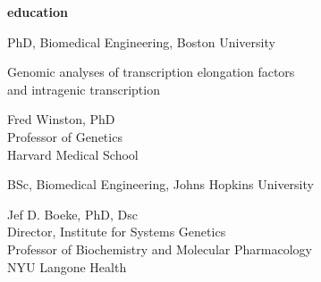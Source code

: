 \documentclass[11pt, a4paper]{article}
\begin{document}
\vspace{2em}
\textbf{\Large education}
\begin{description}[topsep=2pt, align=right, leftmargin=!, labelwidth=\widthof{\textbf{2019}}]
    \item [2019] PhD, Biomedical Engineering, Boston University
        \begin{description}[topsep=0pt, align=right, leftmargin=!, labelwidth=\widthof{research advisor:}, font=\normalfont]
            \item [thesis title:] Genomic analyses of transcription elongation factors \\ and intragenic transcription
            \item [research advisor:] Fred Winston, PhD \\ Professor of Genetics \\ Harvard Medical School
        \end{description}
    \item [2013] BSc, Biomedical Engineering, Johns Hopkins University
        \begin{description}[topsep=0pt, align=right, leftmargin=!, labelwidth=\widthof{research advisor:}, font=\normalfont]
            \item [research advisor:] Jef D. Boeke, PhD, Dsc \\ Director, Institute for Systems Genetics \\ Professor of Biochemistry and Molecular Pharmacology \\ NYU Langone Health
        \end{description}
\end{description}
\end{document}
